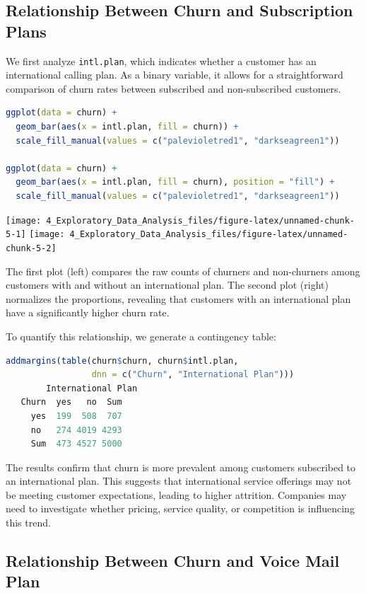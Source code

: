 \documentclass[
  11pt,
]{book}
\newcommand{\passthrough}[1]{#1}
\theoremstyle{definition}
\theoremstyle{definition}
\theoremstyle{definition}
\theoremstyle{definition}
\theoremstyle{remark}
\begin{document}
\subsection*{Relationship Between Churn and Subscription Plans}\label{relationship-between-churn-and-subscription-plans}


We first analyze \passthrough{\lstinline!intl.plan!}, which indicates whether a customer has an international calling plan. As a binary variable, it allows for a straightforward comparison of churn rates between subscribed and non-subscribed customers.

\begin{lstlisting}[language=R]
ggplot(data = churn) + 
  geom_bar(aes(x = intl.plan, fill = churn)) +
  scale_fill_manual(values = c("palevioletred1", "darkseagreen1")) 

ggplot(data = churn) + 
  geom_bar(aes(x = intl.plan, fill = churn), position = "fill") +
  scale_fill_manual(values = c("palevioletred1", "darkseagreen1")) 
\end{lstlisting}

\texttt{[image: 4\_Exploratory\_Data\_Analysis\_files/figure-latex/unnamed-chunk-5-1]} \texttt{[image: 4\_Exploratory\_Data\_Analysis\_files/figure-latex/unnamed-chunk-5-2]}

The first plot (left) compares the raw counts of churners and non-churners among customers with and without an international plan. The second plot (right) normalizes the proportions, revealing that customers with an international plan have a significantly higher churn rate.

To quantify this relationship, we generate a contingency table:

\begin{lstlisting}[language=R]
addmargins(table(churn$churn, churn$intl.plan, 
                 dnn = c("Churn", "International Plan")))
        International Plan
   Churn  yes   no  Sum
     yes  199  508  707
     no   274 4019 4293
     Sum  473 4527 5000
\end{lstlisting}

The results confirm that churn is more prevalent among customers subscribed to an international plan. This suggests that international service offerings may not be meeting customer expectations, leading to higher attrition. Companies may need to investigate whether pricing, service quality, or competition is influencing this trend.

\subsection*{Relationship Between Churn and Voice Mail Plan}\label{relationship-between-churn-and-voice-mail-plan}
\end{document}
